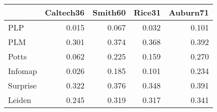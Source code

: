\begin{tabular}{lrrrr}
\toprule
{} & Caltech36 & Smith60 & Rice31 & Auburn71 \\
\midrule
PLP      &     0.015 &   0.067 &  0.032 &    0.101 \\
PLM      &     0.301 &   0.374 &  0.368 &    0.392 \\
Potts    &     0.062 &   0.225 &  0.159 &    0.270 \\
Infomap  &     0.026 &   0.185 &  0.101 &    0.234 \\
Surprise &     0.322 &   0.376 &  0.348 &    0.391 \\
Leiden   &     0.245 &   0.319 &  0.317 &    0.341 \\
\bottomrule
\end{tabular}
